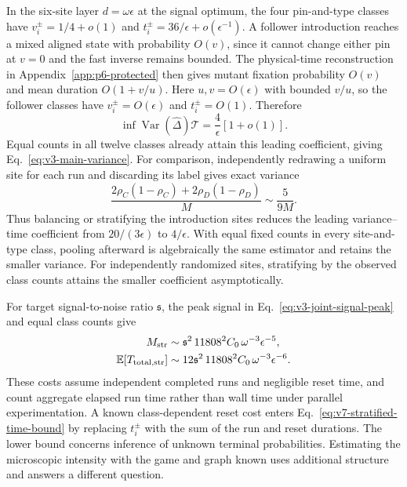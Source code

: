 \documentclass[aps,pre,reprint,amsmath,amssymb,longbibliography]{revtex4-2}
\newcommand{\E}{\mathbb E}
\begin{document}
In the six-site layer $d=\omega\epsilon$ at the signal optimum,
the four pin-and-type classes have
$v_i^{\pm}=1/4+o(1)$ and $t_i^{\pm}=36/\epsilon+o(\epsilon^{-1})$.
A follower introduction reaches a mixed aligned state with probability
$O(v)$, since it cannot change either pin at $v=0$ and the fast
inverse remains bounded. The physical-time reconstruction in
Appendix~\ref{app:p6-protected} then gives mutant fixation probability
$O(v)$ and mean duration $O(1+v/u)$. Here $u,v=O(\epsilon)$
with bounded $v/u$, so the follower classes have
$v_i^{\pm}=O(\epsilon)$ and $t_i^{\pm}=O(1)$. Therefore
\begin{equation}
 \inf\operatorname{Var}(\widehat\Delta)\mathcal T
 =\frac4\epsilon[1+o(1)].
 \label{eq:v7-terminal-optimal-coefficient}
\end{equation}
Equal counts in all twelve classes already attain this leading
coefficient, giving Eq.~\eqref{eq:v3-main-variance}.
For comparison, independently redrawing a uniform site for each run
and discarding its label gives exact variance
\begin{equation}
 \frac{2\rho_C(1-\rho_C)+2\rho_D(1-\rho_D)}M
 \sim\frac5{9M}.
 \label{eq:v3-joint-estimator-variance}
\end{equation}
Thus balancing or stratifying the introduction sites reduces the leading
variance--time coefficient from $20/(3\epsilon)$ to $4/\epsilon$.
With equal fixed counts in every site-and-type class, pooling afterward
is algebraically the same estimator and retains the smaller variance.
For independently randomized sites, stratifying by the observed class
counts attains the smaller coefficient asymptotically.

For target signal-to-noise ratio $\mathfrak s$, the peak signal in
Eq.~\eqref{eq:v3-joint-signal-peak} and equal class counts give
\begin{align}
 M_{\rm str}&\sim\mathfrak s^2\,11808^2C_0\,
                 \omega^{-3}\epsilon^{-5},\notag\\
 \E[T_{{\rm total},{\rm str}}]
 &\sim12\mathfrak s^2\,11808^2C_0\,
                 \omega^{-3}\epsilon^{-6}.
 \label{eq:v3-joint-detection-cost}
\end{align}
These costs assume independent completed runs and negligible reset
time, and count aggregate elapsed run time rather than wall time
under parallel experimentation. A known class-dependent reset cost
enters Eq.~\eqref{eq:v7-stratified-time-bound} by replacing
$t_i^{\pm}$ with the sum of the run and reset durations.
The lower bound concerns inference of unknown terminal
probabilities. Estimating the microscopic intensity with the game and graph known
uses additional structure and answers a different question.
\end{document}

